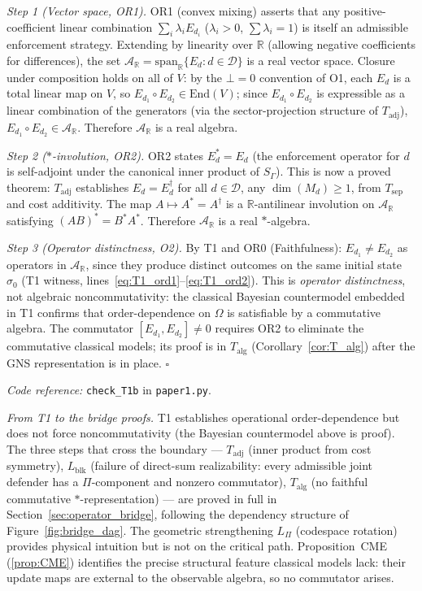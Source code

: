 \documentclass[11pt]{article}
\theoremstyle{remark}
\newcommand{\coderef}[2]{\smallskip\noindent\textit{Code reference:} \texttt{#1} in \texttt{#2}.}
\begin{document}
\textit{Step 1 (Vector space, OR1).}  OR1 (convex mixing) asserts that any positive-coefficient linear combination $\sum_i \lambda_i E_{d_i}$ ($\lambda_i > 0$, $\sum \lambda_i = 1$) is itself an admissible enforcement strategy.  Extending by linearity over $\mathbb{R}$ (allowing negative coefficients for differences), the set $\mathcal{A}_{\mathbb{R}} = \mathrm{span}_\mathbb{R}\{E_d : d \in \mathcal{D}\}$ is a real vector space.  Closure under composition holds on all of $V$: by the $\bot = 0$ convention of O1, each $E_d$ is a total linear map on $V$, so $E_{d_1} \circ E_{d_2} \in \mathrm{End}(V)$; since $E_{d_1} \circ E_{d_2}$ is expressible as a linear combination of the generators (via the sector-projection structure of $T_{\mathrm{adj}}$), $E_{d_1} \circ E_{d_2} \in \mathcal{A}_{\mathbb{R}}$.  Therefore $\mathcal{A}_{\mathbb{R}}$ is a real algebra.

\textit{Step 2 ($*$-involution, OR2).}  OR2 states $E_d^* = E_d$ (the enforcement operator for $d$ is self-adjoint under the canonical inner product of $S_\Gamma$).  This is now a proved theorem: $T_{\mathrm{adj}}$ establishes $E_d = E_d^\dagger$ for all $d \in \mathcal{D}$, any $\dim(M_d) \ge 1$, from $T_{\mathrm{sep}}$ and cost additivity.  The map $A \mapsto A^* = A^\dagger$ is a $\mathbb{R}$-antilinear involution on $\mathcal{A}_{\mathbb{R}}$ satisfying $(AB)^* = B^* A^*$.  Therefore $\mathcal{A}_{\mathbb{R}}$ is a real $*$-algebra.

\textit{Step 3 (Operator distinctness, O2).}  By T1 and OR0 (Faithfulness): $E_{d_1} \ne E_{d_2}$ as operators in $\mathcal{A}_\mathbb{R}$, since they produce distinct outcomes on the same initial state $\sigma_0$ (T1 witness, lines~\eqref{eq:T1_ord1}--\eqref{eq:T1_ord2}).  This is \emph{operator distinctness}, not algebraic noncommutativity: the classical Bayesian countermodel embedded in T1 confirms that order-dependence on $\Omega$ is satisfiable by a commutative algebra.  The commutator $[E_{d_1}, E_{d_2}] \ne 0$ requires OR2 to eliminate the commutative classical models; its proof is in $T_{\mathrm{alg}}$ (Corollary~\ref{cor:T_alg}) after the GNS representation is in place.  \hfill$\square$

\coderef{check\_T1b}{paper1.py}



\medskip\noindent\textit{From T1 to the bridge proofs.}
T1 establishes operational order-dependence but does not force noncommutativity (the Bayesian countermodel above is proof).  The three steps that cross the boundary --- $T_{\mathrm{adj}}$ (inner product from cost symmetry), $L_{\mathrm{blk}}$ (failure of direct-sum realizability: every admissible joint defender has a $\Pi$-component and nonzero commutator), $T_{\mathrm{alg}}$ (no faithful commutative $*$-representation) --- are proved in full in Section~\ref{sec:operator_bridge}, following the dependency structure of Figure~\ref{fig:bridge_dag}.  The geometric strengthening $L_\Pi$ (codespace rotation) provides physical intuition but is not on the critical path.  Proposition~CME (\ref{prop:CME}) identifies the precise structural feature classical models lack: their update maps are external to the observable algebra, so no commutator arises.
\end{document}
